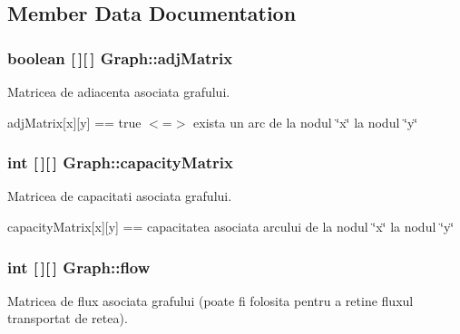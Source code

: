 \subsection{Member Data Documentation}
\hypertarget{classGraph_a87f661f464d587bc3f6b476c85e800ae}{
\subsubsection[{adjMatrix}]{\setlength{\rightskip}{0pt plus 5cm}boolean \mbox{[}$\,$\mbox{]}\mbox{[}$\,$\mbox{]} {\bf Graph::adjMatrix}}}
\label{classGraph_a87f661f464d587bc3f6b476c85e800ae}
Matricea de adiacenta asociata grafului.

adjMatrix\mbox{[}x\mbox{]}\mbox{[}y\mbox{]} == true $<$=$>$ exista un arc de la nodul \char`\"{}x\char`\"{} la nodul \char`\"{}y\char`\"{} \hypertarget{classGraph_a6fe80b61925cedc187fa1ef35c504b1e}{
\subsubsection[{capacityMatrix}]{\setlength{\rightskip}{0pt plus 5cm}int \mbox{[}$\,$\mbox{]}\mbox{[}$\,$\mbox{]} {\bf Graph::capacityMatrix}}}
\label{classGraph_a6fe80b61925cedc187fa1ef35c504b1e}
Matricea de capacitati asociata grafului.

capacityMatrix\mbox{[}x\mbox{]}\mbox{[}y\mbox{]} == capacitatea asociata arcului de la nodul \char`\"{}x\char`\"{} la nodul \char`\"{}y\char`\"{} \hypertarget{classGraph_ad45717436b6a4ea15d30b88263baeb2a}{
\subsubsection[{flow}]{\setlength{\rightskip}{0pt plus 5cm}int \mbox{[}$\,$\mbox{]}\mbox{[}$\,$\mbox{]} {\bf Graph::flow}}}
\label{classGraph_ad45717436b6a4ea15d30b88263baeb2a}
Matricea de flux asociata grafului (poate fi folosita pentru a retine fluxul transportat de retea).


